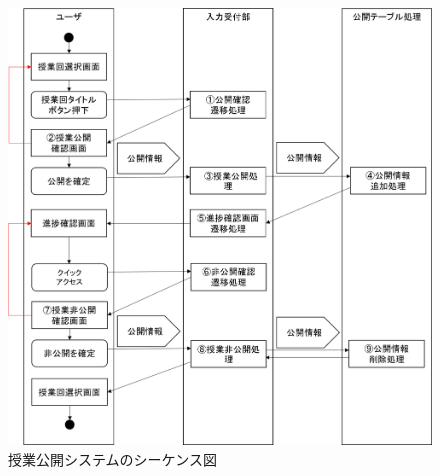 \begin{figure}[htbp]
  \begin{center}
    \includegraphics[width=1\linewidth,clip]{./img/start_lecture/main.png}
    \caption{授業公開システムのシーケンス図}\label{fig:start_lectureseaquence}
  \end{center}
\end{figure}

